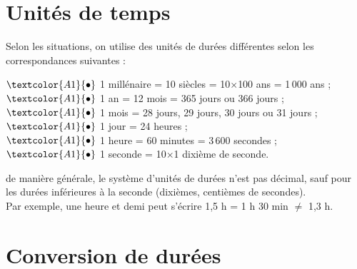 \section{Unités de temps}

   Selon les situations, on utilise des unités de durées différentes selon les correspondances suivantes :
   
   \begin{multicols}{2}
      $\textcolor{A1}{\bullet}$ 1 millénaire = 10 siècles = 10$\times$100 ans = 1\,000 ans ; \\ 
      $\textcolor{A1}{\bullet}$ 1 an = 12 mois = 365 jours ou 366 jours ; \\
      $\textcolor{A1}{\bullet}$ 1 mois =  28 jours, 29 jours, 30 jours ou 31 jours ; \\
      $\textcolor{A1}{\bullet}$ 1 jour = 24 heures ; \\
      $\textcolor{A1}{\bullet}$ 1 heure = 60 minutes = 3\,600 secondes ; \\
      $\textcolor{A1}{\bullet}$ 1 seconde = 10$\times$1 dixième de seconde. 
   \end{multicols}

\begin{remarque}
   de manière générale, le système d'unités de durées n'est pas décimal, sauf pour les durées inférieures à la seconde (dixièmes, centièmes de secondes). \\
   Par exemple, une heure et demi  peut s'écrire 1,5 h = 1 h 30 min $\neq$ 1,3 h.
\end{remarque}


\section{Conversion de durées}

